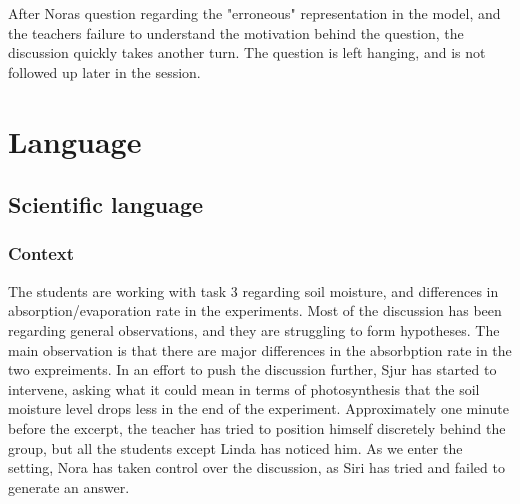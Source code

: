 After Noras question regarding the "erroneous" representation in the model, and the teachers failure to understand the motivation behind the question, the discussion quickly takes another turn. The question is left hanging, and is not followed up later in the session.  


\section{Language}
\subsection{Scientific language}
\subsubsection*{Context}
The students are working with task 3 regarding soil moisture, and differences in absorption/evaporation rate in the experiments. Most of the discussion has been regarding general observations, and they are struggling to form hypotheses. The main observation is that there are major differences in the absorbption rate in the two expreiments. In an effort to push the discussion further, Sjur has started to intervene, asking what it could mean in terms of photosynthesis that the soil moisture level drops less in the end of the experiment. Approximately one minute before the excerpt, the teacher has tried to position himself discretely behind the group, but all the students except Linda has noticed him. As we enter the setting, Nora has taken control over the discussion, as Siri has tried and failed to generate an answer. 

